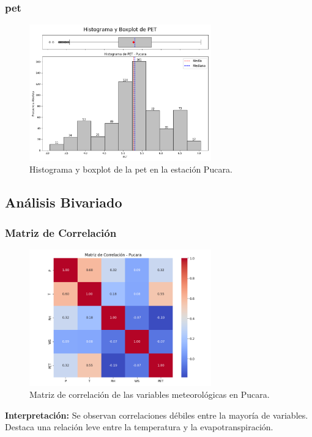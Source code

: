 \subsubsection*{\gls{pet} }
\begin{figure}[htbp]
\centering
\includegraphics[width=0.7\textwidth]{resultados/por_estacion_meteorologica/Pucara/PET_histograma.png}
\caption{Histograma y boxplot de la \gls{pet}  en la estación Pucara.}
\label{fig:pucara_PET}
\end{figure}

\subsection{Análisis Bivariado}

\subsubsection*{Matriz de Correlación}
\begin{figure}[htbp]
\centering
\includegraphics[width=0.7\textwidth]{resultados/por_estacion_meteorologica/Pucara/matriz_correlacion.png}
\caption{Matriz de correlación de las variables meteorológicas en Pucara.}
\label{fig:pucara_corr}
\end{figure}
\textbf{Interpretación:} Se observan correlaciones débiles entre la mayoría de variables. Destaca una relación leve entre la temperatura y la evapotranspiración.

